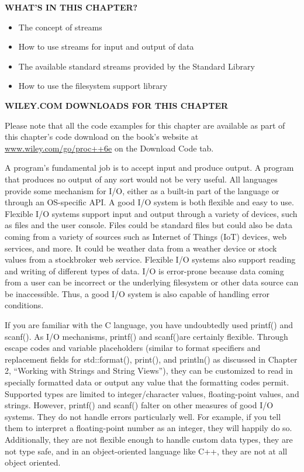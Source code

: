 \noindent
\textbf{WHAT’S IN THIS CHAPTER?}

\begin{itemize}
\item
The concept of streams

\item
How to use streams for input and output of data

\item
The available standard streams provided by the Standard Library

\item
How to use the filesystem support library
\end{itemize}

\noindent
\textbf{WILEY.COM DOWNLOADS FOR THIS CHAPTER}

Please note that all the code examples for this chapter are available as part of this chapter’s code download on the book’s website at \url{www.wiley.com/go/proc++6e} on the Download Code tab.

A program’s fundamental job is to accept input and produce output. A program that produces no output of any sort would not be very useful. All languages provide some mechanism for I/O, either as a built-in part of the language or through an OS-specific API. A good I/O system is both flexible and easy to use. Flexible I/O systems support input and output through a variety of devices, such as files and the user console. Files could be standard files but could also be data coming from a variety of sources such as Internet of Things (IoT) devices, web services, and more. It could be weather data from a weather device or stock values from a stockbroker web service. Flexible I/O systems also support reading and writing of different types of data. I/O is error-prone because data coming from a user can be incorrect or the underlying filesystem or other data source can be inaccessible. Thus, a good I/O system is also capable of handling error conditions.

If you are familiar with the C language, you have undoubtedly used printf() and scanf(). As I/O mechanisms, printf() and scanf()are certainly flexible. Through escape codes and variable placeholders (similar to format specifiers and replacement fields for std::format(), print(), and println() as discussed in Chapter 2, “Working with Strings and String Views”), they can be customized to read in specially formatted data or output any value that the formatting codes permit. Supported types are limited to integer/character values, floating-point values, and strings. However, printf() and scanf() falter on other measures of good I/O systems. They do not handle errors particularly well. For example, if you tell them to interpret a floating-point number as an integer, they will happily do so. Additionally, they are not flexible enough to handle custom data types, they are not type safe, and in an object-oriented language like C++, they are not at all object oriented.

